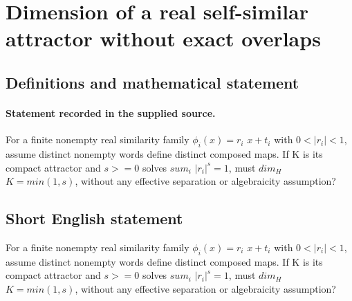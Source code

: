 \documentclass[11pt]{article}
\begin{document}
\section*{Dimension of a real self-similar attractor without exact overlaps}\label{30007169}
\subsection{Definitions and mathematical statement}
\paragraph{Statement recorded in the supplied source.}
For a finite nonempty real similarity family $\phi _i(x)=r_i$ $x+t_i$ with $0<|r_i|<1$, assume distinct nonempty words define distinct composed maps. If K is its compact attractor and $s>=0$ solves $sum_i$ $|r_i|^s=1$, must $dim_H$ $K=min(1,s)$, without any effective separation or algebraicity assumption?
\subsection{Short English statement}
For a finite nonempty real similarity family $\phi _i(x)=r_i$ $x+t_i$ with $0<|r_i|<1$, assume distinct nonempty words define distinct composed maps. If K is its compact attractor and $s>=0$ solves $sum_i$ $|r_i|^s=1$, must $dim_H$ $K=min(1,s)$, without any effective separation or algebraicity assumption?
\end{document}
